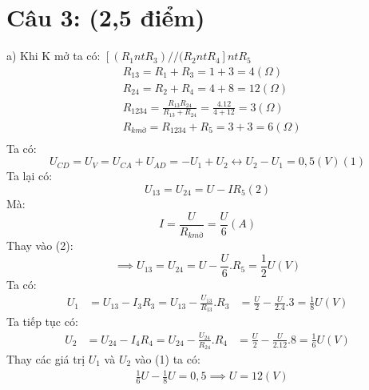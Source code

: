 \documentclass[15pt]{article}
\begin{document}
\section*{Câu 3: (2,5 điểm)}
a) Khi K mở ta có: $[(R_{1} nt R_{3}) // (R_{2} nt R_{4}] nt R_{5}$\\
\begin{equation*}
    \begin{aligned}
        & R_{13} = R_{1} + R_{3} = 1 + 3 = 4 (\Omega)\\
        & R_{24} = R_{2} + R_{4} = 4 + 8 = 12 (\Omega)\\
        & R_{1234} = \frac{R_{13}R_{24}}{R_{13} + R_{24}} = \frac{4.12}{4 + 12} = 3 (\Omega) \\
        & R_{k mở} = R_{1234} + R_{5} = 3 + 3 = 6 (\Omega) \\
    \end{aligned}
\end{equation*}
Ta có:
\begin{equation*}
    U_{CD} = U_{V} = U_{CA} + U_{AD} = -U_{1} + U_{2}
    \leftrightarrow U_{2} - U_{1} = 0,5 (V) (1)
\end{equation*}
Ta lại có:
\begin{equation*}
    U_{13} = U_{24} = U - IR_{5} (2)
\end{equation*}
Mà:
\begin{equation*}
    I = \frac{U}{R_{k mở}} = \frac{U}{6} (A)
\end{equation*}
Thay vào (2):
\begin{equation*}
    \implies U_{13} = U_{24} = U - \frac{U}{6}.R_{5} = \frac{1}{2}U (V)
\end{equation*}
Ta có:
\begin{equation*}
    \begin{aligned}
        U_{1} & = U_{13} - I_{3}R_{3} = U_{13} - \frac{U_{13}}{R_{13}}.R_{3}
              & = \frac{U}{2} - \frac{U}{2.4}.3 = \frac{1}{8}U (V)
    \end{aligned}
\end{equation*}
Ta tiếp tục có:
\begin{equation*}
    \begin{aligned}
        U_{2} & = U_{24} - I_{4}R_{4} = U_{24} - \frac{U_{24}}{R_{24}}.R_{4}
              & = \frac{U}{2} - \frac{U}{2.12}.8 = \frac{1}{6}U (V)
    \end{aligned}
\end{equation*}
Thay các giá trị $U_{1}$ và $U_{2}$ vào (1) ta có:\\
\begin{equation*}
    \begin{aligned}
        & \frac{1}{6}U - \frac{1}{8}U = 0,5
        \implies U = 12 (V)
    \end{aligned}
\end{equation*}
\end{document}
